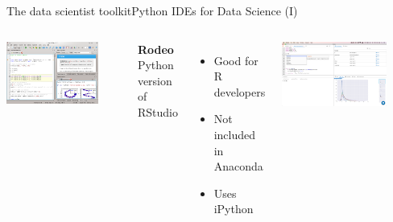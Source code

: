 \documentclass[10pt,compress]{beamer} %
\begin{document}
\begin{frame}{The data scientist toolkit}{Python IDEs for Data Science (I)}
\begin{columns}[t]
		\includegraphics[width=0.8\textwidth]{figs/spyder-ide.png}	

	   \centering \textbf{Rodeo}\\
		Python version of RStudio
		\begin{itemize}
			\item Good for R developers
			\item Not included in Anaconda
			\item Uses iPython
		\end{itemize}
        
        \bigskip

		\includegraphics[width=0.8\textwidth]{figs/rodeo.png}	
	\end{columns}
\end{frame}
\end{document}
